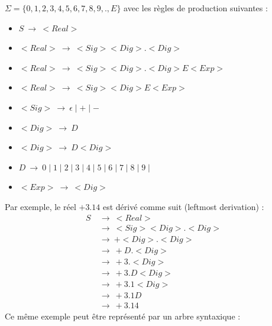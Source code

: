 \begin{myexem}
$\Sigma =\{0,1,2,3,4,5,6,7,8,9,.,E\}$ avec les règles de production suivantes :
\begin{itemize}
\item $S\ \rightarrow\ <Real>$
\item $<Real>\ \rightarrow\ <Sig><Dig>.<Dig>$ 
\item $<Real>\ \rightarrow\ <Sig><Dig>.<Dig>E<Exp>$
\item $<Real>\ \rightarrow\ <Sig><Dig>E<Exp>$
\item $<Sig>\ \rightarrow\ \epsilon\mid +\mid -$
\item $<Dig>\ \rightarrow\ D$
\item $<Dig>\ \rightarrow\ D<Dig>$
\item $D\ \rightarrow\ 0\mid 1\mid 2\mid 3\mid 4\mid 5\mid 6\mid 7\mid 8\mid 9\mid$
\item $<Exp>\ \rightarrow\ <Dig>$
\end{itemize}
Par exemple, le réel $+3.14$ est dérivé comme suit (leftmost derivation) :
\begin{align*}
S\ &\rightarrow\ <Real>\\
&\rightarrow\ <Sig><Dig>.<Dig>\\
&\rightarrow\ +<Dig>.<Dig>\\
&\rightarrow\ +D.<Dig>\\
&\rightarrow\ +3.<Dig>\\
&\rightarrow\ +3.D<Dig>\\
&\rightarrow\ +3.1<Dig>\\
&\rightarrow\ +3.1D\\
&\rightarrow\ +3.14
\end{align*}
Ce même exemple peut être représenté par un arbre syntaxique :
\begin{center}
\end{center}
\end{myexem}


